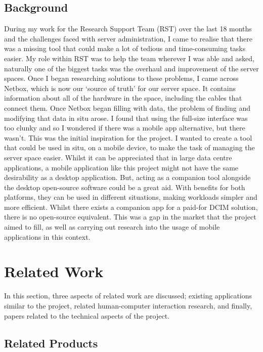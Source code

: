 \documentclass [11pt,a4paper]{article}
\begin{document}
\subsection{Background}
\label{sec:background}
During my work for the Research Support Team (RST) over the last 18 months and the challenges faced with server administration, I came to realise that there was a missing tool that could make a lot of tedious and time-consuming tasks easier. My role within RST was to help the team wherever I was able and asked, naturally one of the biggest tasks was the overhaul and improvement of the server spaces. Once I began researching solutions to these problems, I came across Netbox, which is now our `source of truth' for our server space. It contains information about all of the hardware in the space, including the cables that connect them. Once Netbox began filling with data, the problem of finding and modifying that data in situ arose. I found that using the full-size interface was too clunky and so I wondered if there was a mobile app alternative, but there wasn't. This was the initial inspiration for the project. I wanted to create a tool that could be used in situ, on a mobile device, to make the task of managing the server space easier. Whilst it can be appreciated that in large data centre applications, a mobile application like this project might not have the same desirability as a desktop application. But, acting as a companion tool alongside the desktop open-source software could be a great aid. With benefits for both platforms, they can be used in different situations, making workloads simpler and more efficient. Whilst there exists a companion app for a paid-for DCIM solution, there is no open-source equivalent. This was a gap in the market that the project aimed to fill, as well as carrying out research into the usage of mobile applications in this context.

\pagebreak

\section{Related Work}

In this section, three aspects of related work are discussed; existing applications similar to the project, related human-computer interaction research, and finally, papers related to the technical aspects of the project.

\subsection{Related Products}
\label{sec:app_reviews}
\end{document}

